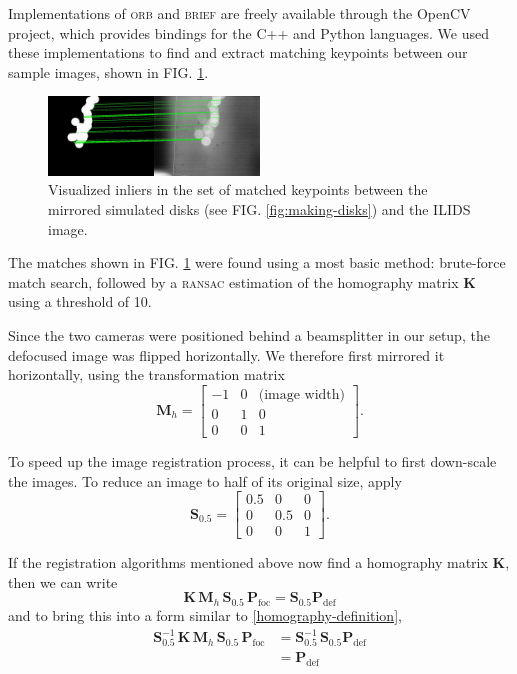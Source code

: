 \documentclass[floatfix,aip,rsi,reprint,graphicx]{revtex4-1}
\begin{document}
Implementations of \textsc{orb} and \textsc{brief} are freely available through
the OpenCV project, which provides bindings for the C++ and Python languages. We
used these implementations to find and extract matching keypoints between our
sample images, shown in FIG. \ref{fig:matching}.

\begin{figure}
    \centering
    \includegraphics[width=0.5\textwidth]{orb_images/asift-matching.jpg}
    \caption{Visualized inliers in the set of matched keypoints between the
    mirrored simulated disks (see FIG. \ref{fig:making-disks}) and the ILIDS image. \label{fig:matching}}
\end{figure}

The matches shown in FIG. \ref{fig:matching} were found using a most basic
method: brute-force match search, followed by a \textsc{ransac} estimation of the
homography matrix $\mathbf{K}$ using a threshold of 10.

Since the two cameras were positioned behind a beamsplitter in our setup, the
defocused image was flipped horizontally. We therefore first mirrored it
horizontally, using the transformation matrix
\begin{equation*}
    \mathbf{M}_h = \left[ \begin{array}{ccc}
    -1 & 0 & \text{(image width)} \\
            0 & 1 & 0 \\
            0 & 0 & 1
    \end{array} \right].
\end{equation*}

To speed up the image registration process, it can be helpful to first down-scale the
images. To reduce an image to half of its original size, apply
\begin{equation*}
    \mathbf{S}_{0.5} = \left[ \begin{array}{ccc}
    0.5 & 0 & 0 \\
            0 & 0.5 & 0 \\
            0 & 0 & 1
    \end{array} \right].
\end{equation*}

If the registration algorithms mentioned above now find a homography matrix
$\mathbf{K}$, then we can write
\begin{equation}
    \mathbf{K}\, \mathbf{M}_h\, \mathbf{S}_{0.5}\, \mathbf{P}_\text{foc} =
    \mathbf{S}_{0.5} \mathbf{P}_\text{def}
\end{equation}
and to bring this into a form similar to \eqref{homography-definition}, 
\begin{align}
    \mathbf{S}_{0.5}^{-1}\, \mathbf{K}\, \mathbf{M}_h\, \mathbf{S}_{0.5}\,
    \mathbf{P}_\text{foc} &=
     \mathbf{S}_{0.5}^{-1}\, \mathbf{S}_{0.5} \mathbf{P}_\text{def} \\
     &= \mathbf{P}_\text{def}
\end{align}
\end{document}
